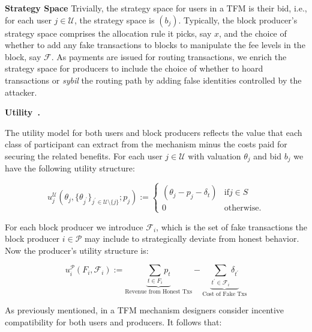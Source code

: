 \documentclass[sigconf,anonymous]{aamas}
\renewcommand{\paragraph}[1]{\smallskip\noindent\textbf{#1}}
\begin{document}
\paragraph{Strategy Space} Trivially, the strategy space for users in a TFM is their bid, i.e., for each user $j\in\mathcal{U}$, the strategy space is $(b_j)$. Typically, the block producer's strategy space comprises the allocation rule it picks, say $x$, and the choice of whether to add any fake transactions to blocks to manipulate the fee levels in the block, say $\mathcal{F}$. As payments are issued for routing transactions, we enrich the strategy space for producers to include the choice of whether to hoard transactions or \textit{sybil} the routing path by adding false identities controlled by the attacker.


\paragraph{Utility~\cite{roughgarden2021,roughgarden2024transaction}.} 

The utility model for both users and block producers reflects the value that each class of participant can extract from the mechanism minus the costs paid for securing the related benefits. For each user $j\in\mathcal{U}$ with valuation $\theta_j$ and bid $b_j$ we have the following utility structure:

\begin{equation}
 u^\mathcal{U}_j(\theta_j,\{\theta_{j^\prime}\}_{j^\prime \in \mathcal{U}\setminus \{j\} }; p_j) :=   \begin{cases}
       \left( \theta_j - p_j - \delta_t \right) & \text{if} j \in S \\
        0  & \text{otherwise.} 
    \end{cases}
\end{equation}

For each block producer we introduce $\mathcal{F}_i$, which is the set of fake transactions the block producer $i\in\mathcal{P}$ may include to strategically deviate from honest behavior. Now the producer's utility structure is:

\begin{equation}
    u^\mathcal{P}_{i}(F_i, \mathcal{F}_i) :=  \underbrace{\sum_{t\in F_i} p_t}_{\text{Revenue from Honest Txs}} - \underbrace{\sum_{t^\prime \in \mathcal{F}_i} \delta_{t^\prime}}_{\text{Cost of Fake Txs}}
\end{equation}

As previously mentioned, in a TFM mechanism designers consider incentive compatibility for both users and producers. It follows that:
\end{document}
